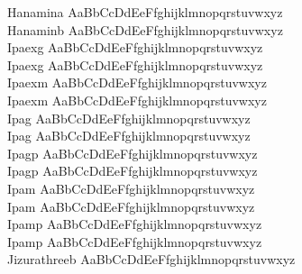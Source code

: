 \begin{tabbing}
Hanamina \> { AaBbCcDdEeFfghijklmnopqrstuvwxyz} \\
Hanaminb \> { AaBbCcDdEeFfghijklmnopqrstuvwxyz} \\
Ipaexg \> { AaBbCcDdEeFfghijklmnopqrstuvwxyz} \\
Ipaexg \> { AaBbCcDdEeFfghijklmnopqrstuvwxyz} \\
Ipaexm \> { AaBbCcDdEeFfghijklmnopqrstuvwxyz} \\
Ipaexm \> { AaBbCcDdEeFfghijklmnopqrstuvwxyz} \\
Ipag \> { AaBbCcDdEeFfghijklmnopqrstuvwxyz} \\
Ipag \> { AaBbCcDdEeFfghijklmnopqrstuvwxyz} \\
Ipagp \> { AaBbCcDdEeFfghijklmnopqrstuvwxyz} \\
Ipagp \> { AaBbCcDdEeFfghijklmnopqrstuvwxyz} \\
Ipam \> { AaBbCcDdEeFfghijklmnopqrstuvwxyz} \\
Ipam \> { AaBbCcDdEeFfghijklmnopqrstuvwxyz} \\
Ipamp \> { AaBbCcDdEeFfghijklmnopqrstuvwxyz} \\
Ipamp \> { AaBbCcDdEeFfghijklmnopqrstuvwxyz} \\
Jizurathreeb \> { AaBbCcDdEeFfghijklmnopqrstuvwxyz} \\

\end{tabbing}
